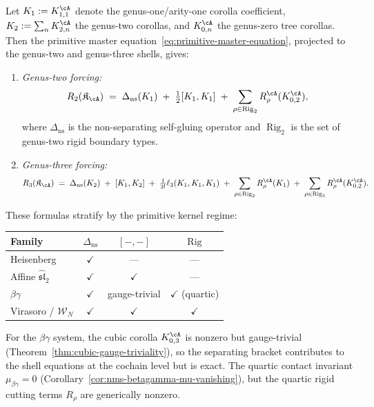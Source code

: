 \begin{proposition}
\label{prop:primitive-shell-equations}
\ClaimStatusProvedHere
{}
Let $K_1 := K_{1,1}^\cA$ denote the genus-one/arity-one corolla
coefficient, $K_2 := \sum_n K_{2,n}^\cA$ the genus-two corollas,
and $K_{0,n}^\cA$ the genus-zero tree corollas.  Then the primitive
master equation~\eqref{eq:primitive-master-equation}, projected to
the genus-two and genus-three shells, gives:
\begin{enumerate}[label=\textup{(\roman*)}]
\item \emph{Genus-two forcing:}
\begin{equation}
\label{eq:primitive-shell-g2}
R_2(\mathfrak{K}_\cA)
\;=\;
\Delta_{\mathrm{ns}}(K_1)
\;+\;
\tfrac{1}{2}[K_1, K_1]
\;+\;
\sum_{\rho \in \operatorname{Rig}_2}
R_\rho^\cA(K_{0,2}^\cA),
\end{equation}
where $\Delta_{\mathrm{ns}}$ is the non-separating self-gluing
operator and $\operatorname{Rig}_2$ is the set of genus-two
rigid boundary types.
\item \emph{Genus-three forcing:}
\begin{equation}
\label{eq:primitive-shell-g3}
R_3(\mathfrak{K}_\cA)
\;=\;
\Delta_{\mathrm{ns}}(K_2)
\;+\;
[K_1, K_2]
\;+\;
\tfrac{1}{3!}\ell_3(K_1, K_1, K_1)
\;+\;
\sum_{\rho \in \operatorname{Rig}_2}
R_\rho^\cA(K_1)
\;+\;
\sum_{\rho \in \operatorname{Rig}_3}
R_\rho^\cA(K_{0,2}^\cA).
\end{equation}
\end{enumerate}
These formulas stratify by the primitive kernel regime:
\begin{center}
\begin{tabular}{lccc}
\toprule
\textbf{Family} & $\Delta_{\mathrm{ns}}$ & $[-,-]$ & $\operatorname{Rig}$ \\
\midrule
Heisenberg & $\checkmark$ & --- & --- \\
Affine $\widehat{\mathfrak{sl}}_2$ & $\checkmark$ & $\checkmark$ & --- \\
$\beta\gamma$ & $\checkmark$ & gauge-trivial & $\checkmark$ (quartic) \\
Virasoro / $\mathcal{W}_N$ & $\checkmark$ & $\checkmark$ & $\checkmark$ \\
\bottomrule
\end{tabular}
\end{center}
For the $\beta\gamma$ system, the cubic corolla $K_{0,3}^\cA$ is nonzero
but gauge-trivial (Theorem~\ref{thm:cubic-gauge-triviality}), so the
separating bracket contributes to the shell equations at the cochain level
but is exact.  The quartic contact invariant
$\mu_{\beta\gamma} = 0$
(Corollary~\ref{cor:nms-betagamma-mu-vanishing}), but the quartic rigid
cutting terms $R_{\rho}$ are generically nonzero.
\end{proposition}


